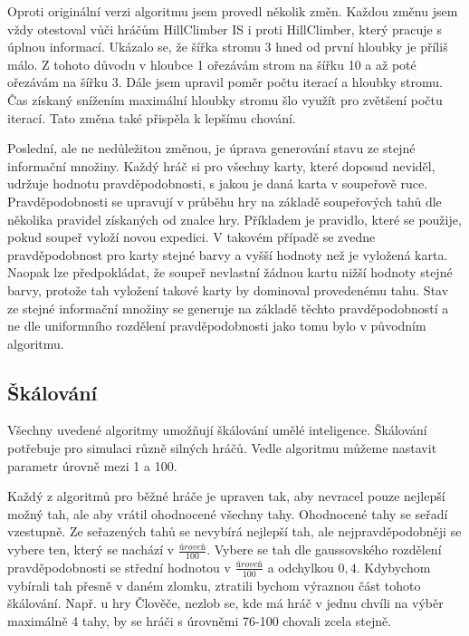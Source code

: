 Oproti originální verzi algoritmu jsem provedl několik změn. Každou změnu jsem vždy otestoval vůči hráčům HillClimber IS i proti HillClimber, který pracuje s úplnou informací. Ukázalo se, že šířka stromu 3 hned od první hloubky je příliš málo. Z tohoto důvodu v hloubce 1 ořezávám strom na šířku 10 a až poté ořezávám na šířku 3. Dále jsem upravil poměr počtu iterací a hloubky stromu. Čas získaný snížením maximální hloubky stromu šlo využít pro zvětšení počtu iterací. Tato změna také přispěla k lepšímu chování. 

Poslední, ale ne nedůležitou změnou, je úprava generování stavu ze stejné informační množiny. Každý hráč si pro všechny karty, které doposud neviděl, udržuje hodnotu pravděpodobnosti, s jakou je daná karta v soupeřově ruce. Pravděpodobnosti se upravují v průběhu hry na základě soupeřových tahů dle několika pravidel získaných od znalce hry. Příkladem je pravidlo, které se použije, pokud soupeř vyloží novou expedici. V takovém případě se zvedne pravděpodobnost pro karty stejné barvy a vyšší hodnoty než je vyložená karta. Naopak lze předpokládat, že soupeř nevlastní žádnou kartu nižší hodnoty stejné barvy, protože tah vyložení takové karty by dominoval provedenému tahu. Stav ze stejné informační množiny se generuje na základě těchto pravděpodobností a ne dle uniformního rozdělení pravděpodobnosti jako tomu bylo v původním algoritmu.

\subsection{Škálování}

Všechny uvedené algoritmy umožňují škálování umělé inteligence. Škálování potřebuje pro simulaci různě silných hráčů. Vedle algoritmu můžeme nastavit parametr úrovně mezi 1 a 100.

Každý z algoritmů pro běžné hráče je upraven tak, aby nevracel pouze nejlepší možný tah, ale aby vrátil ohodnocené všechny tahy. Ohodnocené tahy se seřadí vzestupně.
Ze seřazených tahů se nevybírá nejlepší tah, ale nejpravděpodobněji se vybere ten, který se nachází v $\frac{úroveň}{100}$. Vybere se tah dle gaussovského rozdělení pravděpodobnosti se střední hodnotou v $\frac{úroveň}{100}$ a odchylkou $0,4$. Kdybychom vybírali tah přesně v daném zlomku, ztratili bychom výraznou část tohoto škálování. Např. u hry Člověče, nezlob se, kde má hráč v jednu chvíli na výběr maximálně 4 tahy, by se hráči s úrovněmi 76-100 chovali zcela stejně.

\endinput
